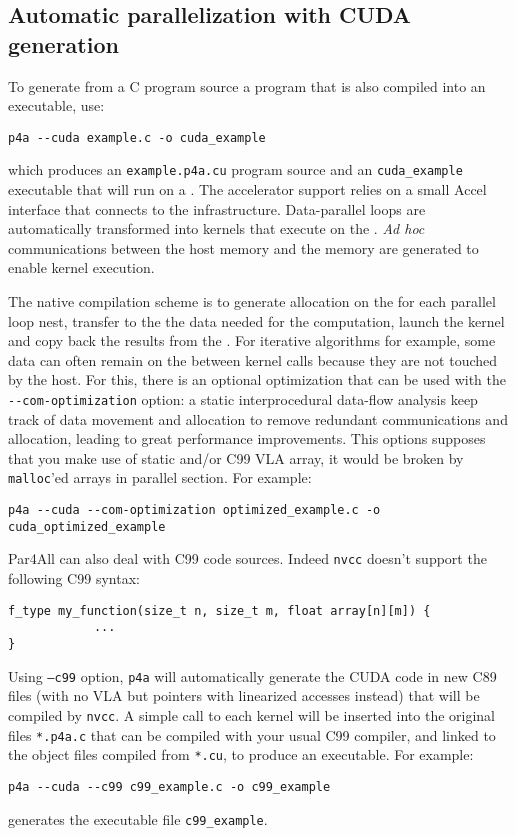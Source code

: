 \documentclass[a4paper]{article}
\begin{document}
\subsection{Automatic parallelization with CUDA generation}
\label{sec:autom-parall-with-cuda}

To generate from a C program source a \Acuda program that is also compiled
into an executable, use:
\begin{verbatim}
p4a --cuda example.c -o cuda_example
\end{verbatim}
which produces an \texttt{example.p4a.cu} \Acuda program source and an
\texttt{cuda\_example} executable that will run on a \Agpu. The \Agpu accelerator
support relies on a small \Apfa Accel interface that connects to the
\Acuda infrastructure. Data-parallel loops are automatically transformed
into \Acuda kernels that execute on the \Agpu. \emph{Ad
  hoc} communications between the host memory and the \Agpu memory are
generated to enable kernel execution.

The native compilation scheme is to generate allocation on the \Agpu for
each parallel loop nest, transfer to the \Agpu the data needed for the
computation, launch the kernel and copy back the results from the \Agpu.
For iterative algorithms for example, some data can often remain on the
\Agpu between kernel calls because they are not touched by the host. For
this, there is an optional optimization that can be used with the
\verb|--com-optimization| option: a static interprocedural data-flow
analysis keep track of data movement and allocation to remove redundant
communications and allocation, leading to great performance improvements. This
options supposes that you make use of static and/or C99 VLA array, it would 
be broken by \texttt{malloc}'ed arrays in parallel section. For example:
\begin{verbatim}
p4a --cuda --com-optimization optimized_example.c -o cuda_optimized_example
\end{verbatim}

Par4All can also deal with C99 code sources. Indeed \texttt{nvcc} doesn't support the
following C99 syntax:
\begin{verbatim}
f_type my_function(size_t n, size_t m, float array[n][m]) {
            ...
}
\end{verbatim}

Using \texttt{--c99} option, \texttt{p4a} will automatically generate the CUDA code
in new C89 files (with no VLA but pointers with linearized accesses
instead) that will be compiled by \texttt{nvcc}. A simple call to each kernel
will be inserted into the original files \texttt{*.p4a.c} that can be compiled
with your usual C99 compiler, and linked to the object files compiled from
\texttt{*.cu}, to produce an executable. For example:
\begin{verbatim}
p4a --cuda --c99 c99_example.c -o c99_example
\end{verbatim}
generates the executable file \texttt{c99\_example}.
\end{document}
